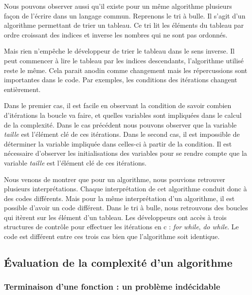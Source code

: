 \documentclass[12pt, twoside, openright]{report}
\begin{document}
Nous pouvons observer aussi qu'il existe pour un même algorithme plusieurs façon de l'écrire dans un langage commun. Reprenons le tri à bulle. Il s'agit d'un algorithme permettant de trier un tableau. Ce tri lit les éléments du tableau par ordre croissant des indices et inverse les nombres qui ne sont pas ordonnés.



Mais rien n'empêche le développeur de trier le tableau dans le sens inverse. Il peut commencer à lire le tableau par les indices descendants, l'algorithme utilisé reste le même. Cela parait anodin comme changement mais les répercussions sont importantes dans le code. Par exemples, les conditions des itérations changent entièrement.



Dans le premier cas, il est facile en observant la condition de savoir combien d'itérations la boucle va faire, et quelles variables sont impliquées dans le calcul de la complexité. Dans le cas précédent nous pouvons observer que la variable \textit{taille} est l'élément clé de ces itérations. Dans le second cas, il est impossible de déterminer la variable impliquée dans celles-ci à partir de la condition. Il est nécessaire d'observer les initialisations des variables pour se rendre compte que la variable \textit{taille} est l'élément clé de ces itérations.

Nous venons de montrer que pour un algorithme, nous pouvions retrouver plusieurs interprétations. Chaque interprétation de cet algorithme conduit donc à des codes différents. Mais pour la même interprétation d'un algorithme, il est possible d'avoir un code différent. Dans le tri à bulle, nous retrouvons des boucles qui itèrent sur les élément d'un tableau. Les développeurs ont accès à trois structures de contrôle pour effectuer les itérations en c : \textit{for} \textit{while}, \textit{do while}. Le code est différent entre ces trois cas bien que l'algorithme soit identique. 


\subsection{Évaluation de la complexité d'un algorithme}

\subsubsection{Terminaison d'une fonction : un problème indécidable}
\end{document}
